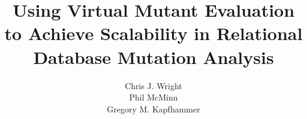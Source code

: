 \documentclass{sig-alternate}
\begin{document}
\title{Using Virtual Mutant Evaluation to Achieve Scalability in Relational Database Mutation Analysis \vspace*{-.1in}}



\author{
\alignauthor
Chris J. Wright\\
\alignauthor
Phil McMinn\\
\alignauthor
Gregory M. Kapfhammer\\
}

\maketitle

\vspace*{-.75in}











\end{document}
